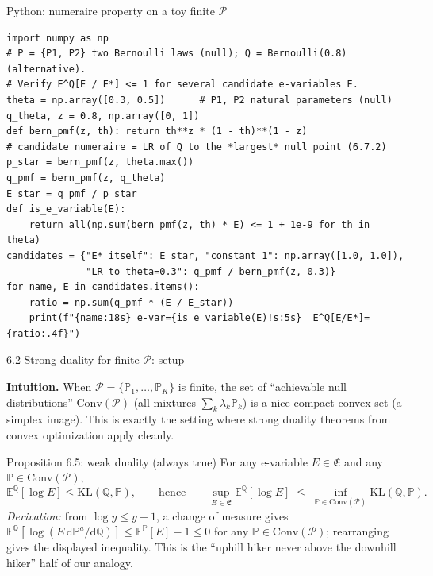 \documentclass[aspectratio=169,10pt]{beamer}
\newcommand{\bE}{\mathbb{E}}
\newcommand{\bP}{\mathbb{P}}
\newcommand{\bQ}{\mathbb{Q}}
\newcommand{\cP}{\mathcal{P}}
\newcommand{\cE}{\mathfrak{E}}
\newcommand{\Conv}{\mathrm{Conv}}
\newcommand{\KL}{\mathrm{KL}}
\begin{document}
\begin{frame}[fragile]{Python: numeraire property on a toy finite $\cP$}

\begin{lstlisting}
import numpy as np
# P = {P1, P2} two Bernoulli laws (null); Q = Bernoulli(0.8) (alternative).
# Verify E^Q[E / E*] <= 1 for several candidate e-variables E.
theta = np.array([0.3, 0.5])      # P1, P2 natural parameters (null)
q_theta, z = 0.8, np.array([0, 1])
def bern_pmf(z, th): return th**z * (1 - th)**(1 - z)
# candidate numeraire = LR of Q to the *largest* null point (6.7.2)
p_star = bern_pmf(z, theta.max())
q_pmf = bern_pmf(z, q_theta)
E_star = q_pmf / p_star
def is_e_variable(E):
    return all(np.sum(bern_pmf(z, th) * E) <= 1 + 1e-9 for th in theta)
candidates = {"E* itself": E_star, "constant 1": np.array([1.0, 1.0]),
              "LR to theta=0.3": q_pmf / bern_pmf(z, 0.3)}
for name, E in candidates.items():
    ratio = np.sum(q_pmf * (E / E_star))
    print(f"{name:18s} e-var={is_e_variable(E)!s:5s}  E^Q[E/E*]={ratio:.4f}")
\end{lstlisting}
\end{frame}

\begin{frame}{6.2 Strong duality for finite $\cP$: setup}

\textbf{Intuition.} When $\cP=\{\bP_1,\dots,\bP_K\}$ is finite, the set
of ``achievable null distributions'' $\Conv(\cP)$ (all mixtures
$\sum_k \lambda_k \bP_k$) is a nice compact convex set (a simplex
image). This is exactly the setting where strong duality theorems from
convex optimization apply cleanly.

\begin{block}{Proposition 6.5: weak duality (always true)}
For any e-variable $E \in \cE$ and any $\bP \in \Conv(\cP)$,
\[
\bE^{\bQ}[\log E] \le \KL(\bQ,\bP), \qquad \text{hence} \qquad
\sup_{E \in \cE} \bE^{\bQ}[\log E] \;\le\; \inf_{\bP \in \Conv(\cP)} \KL(\bQ,\bP).
\]
\emph{Derivation:} from $\log y \le y-1$, a change of measure gives
$\bE^{\bQ}[\log(E \, \mathrm{d}\bP^a/\mathrm{d}\bQ)] \le \bE^{\bP}[E]-1 \le 0$
for any $\bP\in\Conv(\cP)$; rearranging gives the displayed inequality.
This is the ``uphill hiker never above the downhill hiker'' half of
our analogy.
\end{block}
\end{frame}
\end{document}
